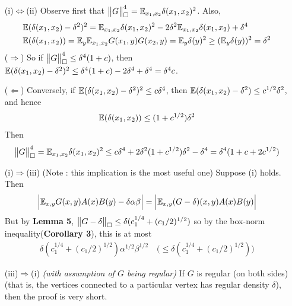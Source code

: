 \documentclass[12pt,a4paper]{report}
\newenvironment{proof}
{\begin{changemargin}{1cm}{0.5cm}
	}%
	{\end{changemargin}
}
\begin{document}
\begin{proof}
\pf \begin{itemize}
\item[(i)$\Leftrightarrow$(ii)] Observe first that $\bigl\lVert G\bigr\rVert_{\tiny{\square}}^4 = \mathbb{E}_{x_1,x_2} \delta(x_1,x_2)^2$. Also,
\begin{align*}
& \mathbb{E}(\delta(x_1,x_2)-\delta^2)^2 = \mathbb{E}_{x_1,x_2} \delta(x_1,x_2)^2 - 2\delta^2 \mathbb{E}_{x_1,x_2} \delta(x_1,x_2) + \delta^4 \\
& \mathbb{E}(\delta(x_1,x_2)) = \mathbb{E}_y \mathbb{E}_{x_1,x_2} G(x_1,y) G(x_2,y) = \mathbb{E}_y \delta(y)^2 \geq (\mathbb{E}_y \delta(y))^2 = \delta^2
\end{align*}
($\Rightarrow$) So if $\bigl\lVert G\bigr\rVert_{\tiny{\square}}^4 \leq \delta^4 (1+c)$, then $\mathbb{E}(\delta(x_1,x_2)-\delta^2)^2 \leq \delta^4 (1+c) -2\delta^4 + \delta^4 = \delta^4 c$.
\s

($\Leftarrow$) Conversely, if $\mathbb{E}(\delta(x_1,x_2)-\delta^2)^2 \leq c\delta^4$, then $\mathbb{E}(\delta(x_1,x_2)-\delta^2) \leq c^{1/2} \delta^2$, and hence
\begin{align*}
\mathbb{E}(\delta(x_1,x_2)) \leq (1+ c^{1/2}) \delta^2
\end{align*}
Then 
\begin{align*}
\bigl\lVert G\bigr\rVert_{\tiny{\square}}^4 = \mathbb{E}_{x_1,x_2} \delta(x_1,x_2)^2 \leq c\delta^4 + 2\delta^2(1+c^{1/2}) \delta^2 - \delta^4 = \delta^4(1+c+2c^{1/2})
\end{align*}
\item[(i)$\Rightarrow$(iii)] (Note : this implication is the most useful one) Suppose (i) holds. Then
\begin{align*}
\Big| \mathbb{E}_{x,y} G(x,y)A(x)B(y) - \delta \alpha \beta \Big| = \Big| \mathbb{E}_{x,y} (G-\delta)(x,y) A(x)B(y)   \Big|
\end{align*}
But by \textbf{Lemma 5}, $\bigl\lVert G-\delta\bigr\rVert_{\tiny{\square}} \leq \delta (c_1^{1/4} + (c_1/2)^{1/2})$ so by the box-norm inequality(\textbf{Corollary 3}), this is at most
\begin{align*}
\delta (c_1^{1/4} + (c_1/2)^{1/2}) \alpha^{1/2} \beta^{1/2} \quad \Big( \leq \delta(c_1^{1/4} + (c_1/2)^{1/2}) \Big)
\end{align*}
\item[(iii)$\Rightarrow$(i)] \emph{(with assumption of $G$ being regular)} If $G$ is regular (on both sides) (that is, the vertices connected to a particular vertex has regular density $\delta$), then the proof is very short.


\end{itemize}
\end{proof}
\end{document}
